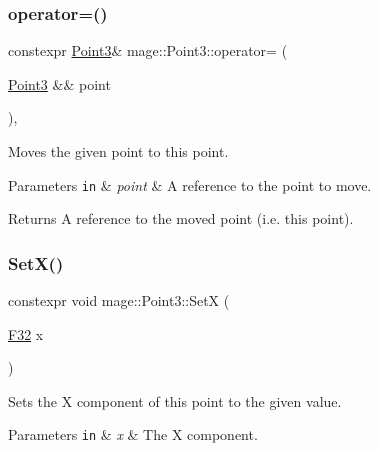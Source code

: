 \subsubsection{\texorpdfstring{operator=()}{operator=()}\hspace{0.1cm}{\footnotesize\ttfamily [2/2]}}
{\footnotesize\ttfamily constexpr \mbox{\hyperlink{structmage_1_1_point3}{Point3}}\& mage\+::\+Point3\+::operator= (\begin{DoxyParamCaption}\item[{\mbox{\hyperlink{structmage_1_1_point3}{Point3}} \&\&}]{point }\end{DoxyParamCaption})\hspace{0.3cm}{\ttfamily [default]}, {\ttfamily [noexcept]}}

Moves the given point to this point.


\begin{DoxyParams}[1]{Parameters}
\mbox{\tt in}  & {\em point} & A reference to the point to move. \\
\hline
\end{DoxyParams}
\begin{DoxyReturn}{Returns}
A reference to the moved point (i.\+e. this point). 
\end{DoxyReturn}
\mbox{\label{structmage_1_1_point3_a62c79c14704a8f53e571d693aafa8471}} 
\subsubsection{\texorpdfstring{Set\+X()}{SetX()}}
{\footnotesize\ttfamily constexpr void mage\+::\+Point3\+::\+SetX (\begin{DoxyParamCaption}\item[{\mbox{\hyperlink{namespacemage_aa97e833b45f06d60a0a9c4fc22ae02c0}{F32}}}]{x }\end{DoxyParamCaption})\hspace{0.3cm}{\ttfamily [noexcept]}}

Sets the X component of this point to the given value.


\begin{DoxyParams}[1]{Parameters}
\mbox{\tt in}  & {\em x} & The X component. \\
\hline
\end{DoxyParams}
\mbox{\label{structmage_1_1_point3_a7ac2ea5fcd095cf86efa1597c0da270d}} 
